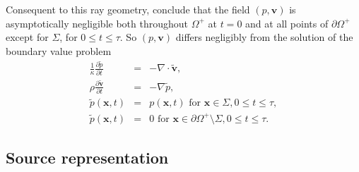 \documentclass[12pt]{geophysics}
\newcommand{\bx}{\mathbf{x}}
\newcommand{\bv}{\mathbf{v}}
\begin{document}
Consequent to this ray geometry, conclude that the field $(p,\bv)$  is asymptotically negligible both
throughout $\Omega^+$ at $t=0$ and at all points of 
$\partial \Omega^+$ except for $\Sigma$, for $0\le t \le \tau$. So $(p,\bv)$ differs
negligibly from the solution of the boundary value problem 
\begin{eqnarray}
\label{eqn:aweloc}
  \frac{1}{\kappa}\frac{\partial \tilde{p}}{\partial t} & = & - \nabla \cdot \tilde{\bv}, \nonumber \\
  \rho\frac{\partial \tilde{\bv}}{\partial t} & = & - \nabla
                                                    \tilde{p}, \nonumber \\
  \tilde{p}(\bx,t) & = & p(\bx,t) \mbox{ for } \bx \in \Sigma, 0 \le t \le 
  \tau, \nonumber \\
  \tilde{p}(\bx,t) & = & 0 \mbox{ for } \bx \in \partial \Omega^+ \setminus \Sigma, 0 \le t \le
 \tau.
\end{eqnarray}

\subsection{Source representation}
\end{document}
